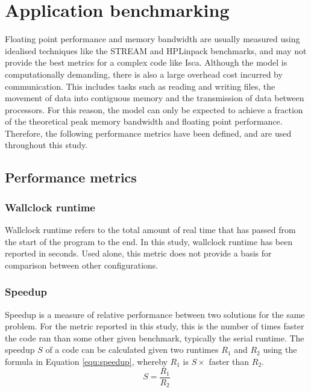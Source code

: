 \documentclass[a4paper,11pt]{report}
\begin{document}
\section{Application benchmarking}
\label{sec:app-benchmarking}
Floating point performance and memory bandwidth are usually measured using idealised techniques like the STREAM and HPLinpack benchmarks, and may not provide the best metrics for a complex code like Isca. Although the model is computationally demanding, there is also a large overhead cost incurred by communication. This includes tasks such as reading and writing files, the movement of data into contiguous memory and the transmission of data between processors. For this reason, the model can only be expected to achieve a fraction of the theoretical peak memory bandwidth and floating point performance. Therefore, the following performance metrics have been defined, and are used throughout this study.
\subsection{Performance metrics}

\subsubsection{Wallclock runtime} 
Wallclock runtime refers to the total amount of real time that has passed from the start of the program to the end. In this study, wallclock runtime has been reported in seconds. Used alone, this metric does not provide a basis for comparison between other configurations. 
	
\subsubsection{Speedup} 
Speedup is a measure of relative performance between two solutions for the same problem. For the metric reported in this study, this is the number of times faster the code ran than some other given benchmark, typically the serial runtime. The speedup $S$ of a code can be calculated given two runtimes $R_1$ and $R_2$ using the formula in Equation \ref{equ:speedup}, whereby $R_1$ is $S\times$ faster than $R_2$.
\begin{equation}
S = \frac{R_1}{R_2} 
\label{equ:speedup}
\end{equation}
	
\end{document}
